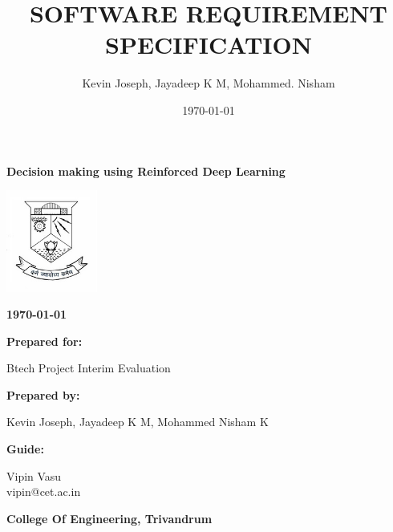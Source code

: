 \documentclass[twoside,letterpaper]{article}
\title{SOFTWARE REQUIREMENT SPECIFICATION}
\author{Kevin Joseph, Jayadeep K M, Mohammed. Nisham}
\date{\today}
\begin{document}


\bigskip

{\centering{}\bfseries\color{black}
Decision making using Reinforced Deep Learning
\par}


\bigskip

\centering
\includegraphics[width=3cm]{images/logo.jpg}

\bigskip

{\centering{}\bfseries\color{black}
\today
\par}


\bigskip


\bigskip

{\centering{}\bfseries\color{black}
Prepared for:
\par}

{\centering{}\color{black}
Btech Project Interim Evaluation
\par}


\bigskip


\bigskip

{\centering{}\bfseries\color{black}
Prepared by:
\par}

{\centering{}\color{black}
Kevin Joseph, Jayadeep K M, Mohammed Nisham K
\par}
\bigskip
{\centering{}\bfseries\color{black}
Guide:
\par}

{\centering{}\color{black}
Vipin Vasu\\
vipin@cet.ac.in\\
\par}
\bigskip
{\centering{}\bfseries\color{black}
College Of Engineering, Trivandrum
\par}

\end{document}
